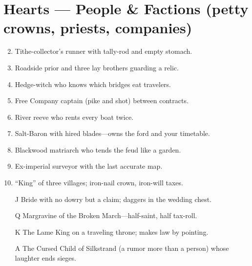 \section*{Hearts --- People \& Factions (petty crowns, priests, companies)}
\label{sec:acasia-people}
\begin{enumerate}
\setcounter{enumi}{1}
\item Tithe-collector's runner with tally-rod and empty stomach.
\item Roadside prior and three lay brothers guarding a relic.
\item Hedge-witch who knows which bridges eat travelers.
\item Free Company captain (pike and shot) between contracts.
\item River reeve who rents every boat twice.
\item Salt-Baron with hired blades---owns the ford and your timetable.
\item Blackwood matriarch who tends the feud like a garden.
\item Ex-imperial surveyor with the last accurate map.
\item ``King'' of three villages; iron-nail crown, iron-will taxes.
\item[J] Bride with no dowry but a claim; daggers in the wedding chest.
\item[Q] Margravine of the Broken March---half-saint, half tax-roll.
\item[K] The Lame King on a traveling throne; makes law by pointing.
\item[A] The Cursed Child of Silkstrand (a rumor more than a person) whose laughter ends sieges.
\end{enumerate}

